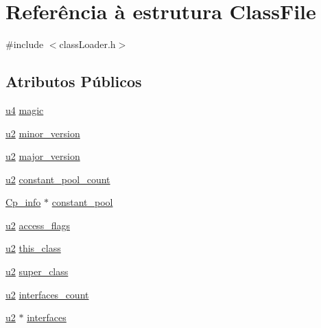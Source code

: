 \hypertarget{struct_class_file}{}\section{Referência à estrutura Class\+File}
\label{struct_class_file}


{\ttfamily \#include $<$class\+Loader.\+h$>$}

\subsection*{Atributos Públicos}
\begin{DoxyCompactItemize}
\item 
\hyperlink{util_8h_ae391a1d79bb0c8cbc283f0283e3c098b}{u4} \hyperlink{struct_class_file_a09085e9db513dae2f46da6e0a26c1b59}{magic}
\item 
\hyperlink{util_8h_a55ef8d87fd202b8417704c089899c5b9}{u2} \hyperlink{struct_class_file_af0db7b0ea01cb9cea2cee177ca81df09}{minor\+\_\+version}
\item 
\hyperlink{util_8h_a55ef8d87fd202b8417704c089899c5b9}{u2} \hyperlink{struct_class_file_abede9cb937e65072517d0ee6e26e2757}{major\+\_\+version}
\item 
\hyperlink{util_8h_a55ef8d87fd202b8417704c089899c5b9}{u2} \hyperlink{struct_class_file_ac8fdf5cccfd632da4fdb21ae63fffa7a}{constant\+\_\+pool\+\_\+count}
\item 
\hyperlink{struct_cp__info}{Cp\+\_\+info} $\ast$ \hyperlink{struct_class_file_a79a3f2798c8da988fd7347db3c095d44}{constant\+\_\+pool}
\item 
\hyperlink{util_8h_a55ef8d87fd202b8417704c089899c5b9}{u2} \hyperlink{struct_class_file_ae88db578147f7ee0d6fc1aeacb341854}{access\+\_\+flags}
\item 
\hyperlink{util_8h_a55ef8d87fd202b8417704c089899c5b9}{u2} \hyperlink{struct_class_file_a2d33db0a560a71b94bc572dd1e4ec03a}{this\+\_\+class}
\item 
\hyperlink{util_8h_a55ef8d87fd202b8417704c089899c5b9}{u2} \hyperlink{struct_class_file_a5f6c11c0ccb02fd992b5c102725253ec}{super\+\_\+class}
\item 
\hyperlink{util_8h_a55ef8d87fd202b8417704c089899c5b9}{u2} \hyperlink{struct_class_file_a337fcb7da33d1b64631441115c7de305}{interfaces\+\_\+count}
\item 
\hyperlink{util_8h_a55ef8d87fd202b8417704c089899c5b9}{u2} $\ast$ \hyperlink{struct_class_file_af599de97e062c98966470f1590496425}{interfaces}
\item 

\end{DoxyCompactItemize}
